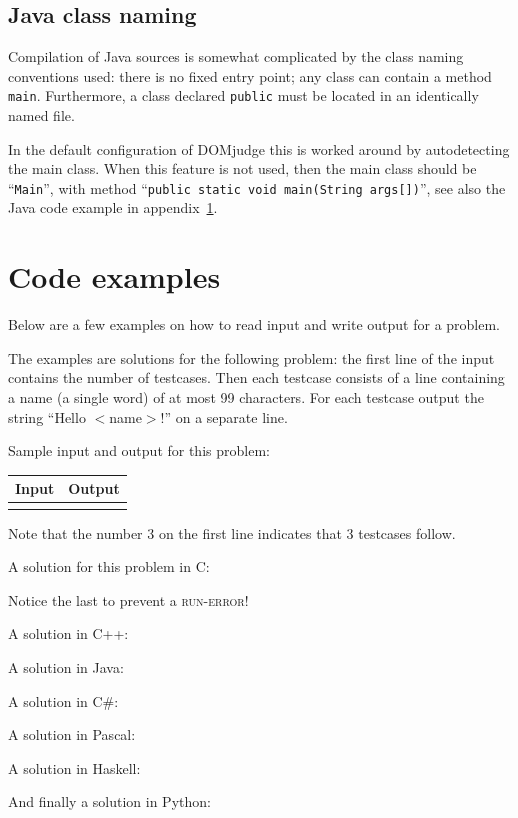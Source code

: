 \subsection{Java class naming}

Compilation of Java sources is somewhat complicated by the class
naming conventions used: there is no fixed entry point; any class can
contain a method \texttt{main}. Furthermore, a class declared
\texttt{public} must be located in an identically named file.

In the default configuration of DOMjudge this is worked around by
autodetecting the main class. When this feature is not used, then
the main class should be ``\verb!Main!'', with method
``\verb!public static void main(String args[])!'', see also the Java
code example in appendix~\ref{codeexamples}.

\newpage
\appendix

\section{Code examples}\label{codeexamples}

Below are a few examples on how to read input and write output for a
problem.

The examples are solutions for the following problem: the first line
of the input contains the number of testcases. Then each testcase
consists of a line containing a name (a single word) of at most 99
characters. For each testcase output the string ``Hello $<$name$>$!''
on a separate line.

Sample input and output for this problem:

\begin{tabular}{|p{}|p{}|}
\hline
\textbf{Input} & \textbf{Output} \\
\hline
 &
 \\
\hline
\end{tabular}

Note that the number 3 on the first line indicates that 3 testcases
follow.

A solution for this problem in C:

Notice the last  to prevent a \textsc{run-error}!

\newpage

A solution in C++:

A solution in Java:

\newpage

A solution in C\#:

A solution in Pascal:

A solution in Haskell:

And finally a solution in Python:


